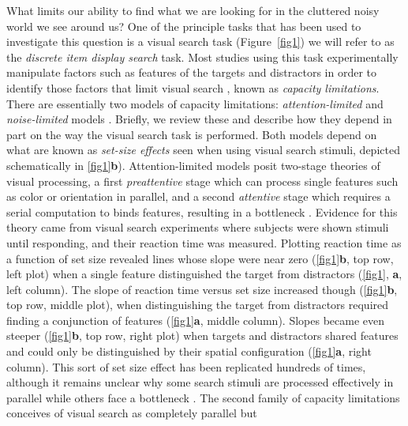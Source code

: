 \documentclass[10pt,letterpaper]{article}
\begin{document}
What limits our ability to find what we are looking for in the cluttered noisy world we 
see around us? One of the principle tasks that has been used to investigate this question 
is a visual search task (Figure~\ref{fig1}) \cite{wolfeVisualSearch1998}
we will refer to as the \emph{discrete item display search} task. 
Most studies using this task experimentally manipulate factors such as features of the targets and 
distractors in order to identify those factors that limit visual search 
\cite{ecksteinVisualSearchRetrospective2011,wolfeFiveFactorsThat2017}, known as 
\emph{capacity limitations}. There are essentially two models of capacity limitations: 
\emph{attention-limited} and \emph{noise-limited} models \cite{palmerSignalDetectionEvidence2011}. 
Briefly, we review these and describe how they depend in part on the 
way the visual search task is performed. Both models 
depend on what are known as \emph{set-size effects} seen when using visual search stimuli, 
depicted schematically in \ref{fig1}\textbf{b}).
Attention-limited models posit two-stage theories of visual processing, a first 
\emph{preattentive} stage which can process single features such as color or orientation 
in parallel, and a second \emph{attentive} stage which requires a serial computation to 
binds features, resulting in a bottleneck 
\cite{treismanFeatureintegrationTheoryAttention1980,wolfeGuidedSearchAlternative1989,wolfeGuidedSearchRevised1994}. 
Evidence for this theory came from visual search 
experiments where subjects were shown stimuli until responding, and their reaction time 
was measured. Plotting reaction time as a function of set size revealed 
lines whose slope were near zero (\ref{fig1}\textbf{b}, top row, left plot) 
when a single feature distinguished the target from 
distractors (\ref{fig1}, \textbf{a}, left column). 
The slope of reaction time versus set size increased though (\ref{fig1}\textbf{b}, top row, middle plot), 
when distinguishing the target from distractors required finding a 
conjunction of features (\ref{fig1}\textbf{a}, middle column). Slopes became 
even steeper (\ref{fig1}\textbf{b}, top row, right plot) 
when targets and distractors shared features and could only be 
distinguished by their spatial configuration (\ref{fig1}\textbf{a}, right column). 
This sort of set size effect has been replicated hundreds of times, although it remains 
unclear why some search stimuli are processed effectively in parallel while others 
face a bottleneck \cite{wolfeWhatCanMillion1998,wolfeFiveFactorsThat2017}.
The second family of capacity limitations conceives of visual search as completely parallel but 
\end{document}
